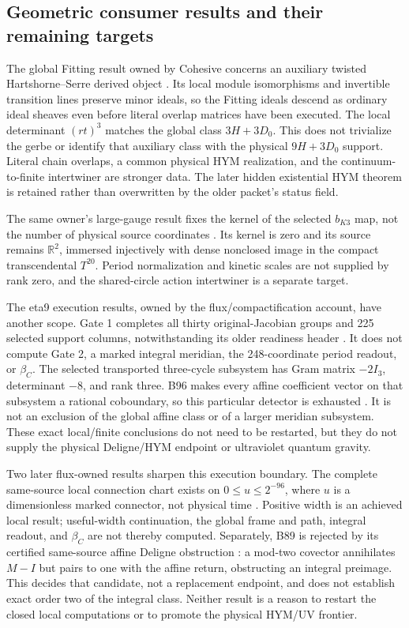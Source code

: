 \documentclass[11pt]{article}
\begin{document}
\subsection{Geometric consumer results and their remaining targets}
\label{sec:geometric-consumers}

The global Fitting result owned by Cohesive concerns an auxiliary twisted
Hartshorne--Serre derived object \cite{Cohesive14,FrozenFitting}. Its local
module isomorphisms and invertible transition lines preserve minor ideals,
so the Fitting ideals descend as ordinary ideal sheaves even before literal
overlap matrices have been executed. The local determinant \((rt)^3\)
matches the global class \(3H+3D_0\). This does not trivialize the gerbe or
identify that auxiliary class with the physical \(9H+3D_0\) support.
Literal chain overlaps, a common physical HYM realization, and the
continuum-to-finite intertwiner are stronger data. The later hidden
existential HYM theorem is retained rather than overwritten by the older
packet's status field.

The same owner's large-gauge result fixes the kernel of the selected
\(b_{K3}\) map, not the number of physical source coordinates
\cite{FrozenBK3}. Its kernel is zero and its source remains \(\mathbb R^2\),
immersed injectively with dense nonclosed image in the compact transcendental
\(T^{20}\). Period normalization and kinetic scales are not supplied by
rank zero, and the shared-circle action intertwiner is a separate target.

The eta9 execution results, owned by the flux/compactification account, have
another scope. Gate 1 completes all thirty original-Jacobian groups and 225
selected support columns, notwithstanding its older readiness header
\cite{FrozenGate1}. It does not compute Gate 2, a marked integral meridian,
the 248-coordinate period readout, or \(\beta_C\). The selected transported
three-cycle subsystem has Gram matrix \(-2I_3\), determinant \(-8\), and
rank three. B96 makes every affine coefficient vector on that subsystem a
rational coboundary, so this particular detector is exhausted
\cite{FrozenB96}. It is not an exclusion of the global affine class or of a
larger meridian subsystem. These exact local/finite conclusions do not need
to be restarted, but they do not supply the physical Deligne/HYM endpoint or
ultraviolet quantum gravity.

Two later flux-owned results sharpen this execution boundary. The complete
same-source local connection chart exists on
\(0\leq u\leq2^{-96}\), where \(u\) is a dimensionless marked connector,
not physical time \cite{FrozenTube}. Positive width is an achieved local
result; useful-width continuation, the global frame and path, integral
readout, and \(\beta_C\) are not thereby computed. Separately, B89 is
rejected by its certified same-source affine Deligne obstruction
\cite{FrozenB89}: a mod-two covector annihilates \(M-I\) but pairs to one
with the affine return, obstructing an integral preimage. This decides that
candidate, not a replacement endpoint, and does not establish exact order
two of the integral class. Neither result is a reason to restart the closed
local computations or to promote the physical HYM/UV frontier.
\end{document}
